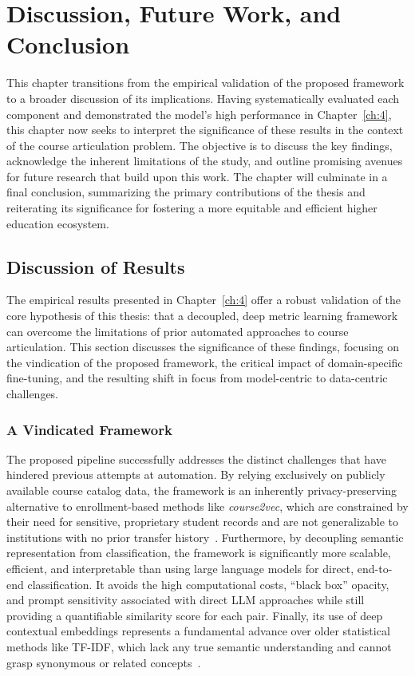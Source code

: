 \chapter{Discussion, Future Work, and Conclusion}
This chapter transitions from the empirical validation of the proposed framework to a broader discussion of its implications. Having systematically evaluated each component and demonstrated the model's high performance in Chapter~\ref{ch:4}, this chapter now seeks to interpret the significance of these results in the context of the course articulation problem. The objective is to discuss the key findings, acknowledge the inherent limitations of the study, and outline promising avenues for future research that build upon this work. The chapter will culminate in a final conclusion, summarizing the primary contributions of the thesis and reiterating its significance for fostering a more equitable and efficient higher education ecosystem.

\section{Discussion of Results}\label{ch:5.1}
The empirical results presented in Chapter~\ref{ch:4} offer a robust validation of the core hypothesis of this thesis: that a decoupled, deep metric learning framework can overcome the limitations of prior automated approaches to course articulation. This section discusses the significance of these findings, focusing on the vindication of the proposed framework, the critical impact of domain-specific fine-tuning, and the resulting shift in focus from model-centric to data-centric challenges.

\subsection{A Vindicated Framework}\label{ch:5.1.1}
The proposed pipeline successfully addresses the distinct challenges that have hindered previous attempts at automation. By relying exclusively on publicly available course catalog data, the framework is an inherently privacy-preserving alternative to enrollment-based methods like \emph{course2vec}, which are constrained by their need for sensitive, proprietary student records and are not generalizable to institutions with no prior transfer history~\cite{pardos2018connectionistrecommendationwildutility, slade10.1177/0002764213479366}. Furthermore, by decoupling semantic representation from classification, the framework is significantly more scalable, efficient, and interpretable than using large language models for direct, end-to-end classification. It avoids the high computational costs, ``black box'' opacity, and prompt sensitivity associated with direct LLM approaches while still providing a quantifiable similarity score for each pair. Finally, its use of deep contextual embeddings represents a fundamental advance over older statistical methods like TF-IDF, which lack any true semantic understanding and cannot grasp synonymous or related concepts~\cite{AIZAWA200345}.

